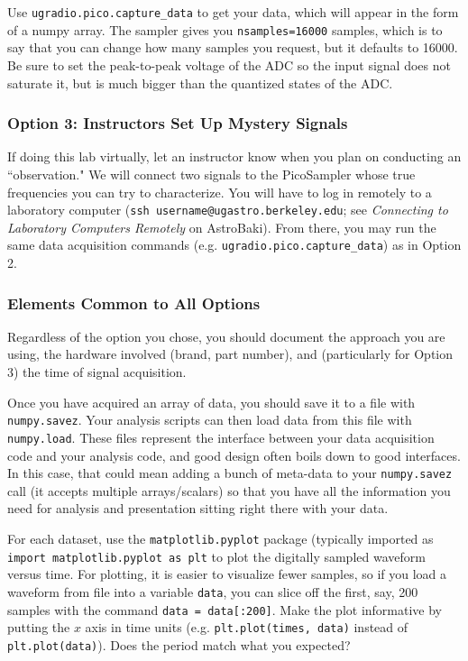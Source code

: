 \documentclass[11pt,preprint]{aastex}
\begin{document}
Use {\tt ugradio.pico.capture\_data} to get your data, which will appear in the form
of a numpy array.
The sampler gives you {\tt nsamples=16000} samples, which is to
say that you can change how many samples you request, but it defaults to 16000. 
Be sure to set the
peak-to-peak voltage of the ADC so the input signal does not saturate it, but is much
bigger than the quantized states of the ADC.

\subsubsection{Option 3: Instructors Set Up Mystery Signals}

If doing this lab virtually, let an instructor know when you plan on conducting an
``observation."  We will connect two signals to the PicoSampler whose true frequencies 
you can try to characterize. You will have to log in remotely to a laboratory
computer ({\tt ssh username@ugastro.berkeley.edu}; see {\it Connecting to Laboratory
Computers Remotely} on AstroBaki). From there, you may run the same data acquisition
commands (e.g. {\tt ugradio.pico.capture\_data}) as in Option 2.

\subsubsection{Elements Common to All Options}

Regardless of the option you chose, you should document the approach you are using,
the hardware involved (brand, part number), and (particularly for Option 3) the
time of signal acquisition.

Once you have acquired an array of data, you should save it to a file
with {\tt numpy.savez}.  Your analysis scripts can then 
load data from this file with {\tt numpy.load}. These files represent the interface
between your data acquisition code and your analysis code, and good design often
boils down to good interfaces. In this case, that could mean adding a bunch of meta-data
to your {\tt numpy.savez} call (it accepts multiple arrays/scalars) so that you have
all the information you need for analysis and presentation sitting right there with your data.

For each dataset, use the {\tt matplotlib.pyplot} package (typically imported
as {\tt import matplotlib.pyplot as plt} to plot
the digitally sampled waveform versus
time.  
For plotting, it is easier to visualize fewer samples, so if you load a waveform from file into
a variable {\tt data}, you can slice off the first, say, 200 samples with the command {\tt data = data[:200]}.
Make the plot informative by putting the $x$ axis in time units (e.g. {\tt plt.plot(times, data)} instead of {\tt plt.plot(data)}). 
Does the period match what you expected?
\end{document}
